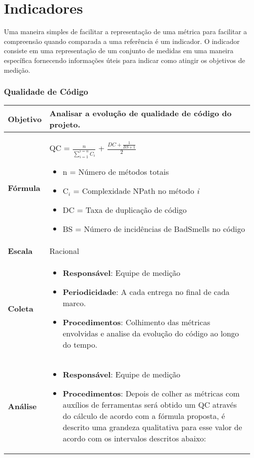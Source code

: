 \chapter{Indicadores}

Uma maneira simples de facilitar a representação de uma métrica para facilitar a compreensão quando comparada a uma referência é um indicador. O indicador consiste em uma representação de um conjunto de medidas em uma maneira específica fornecendo informações úteis para indicar como atingir os objetivos de medição.

\subsection{Qualidade de Código}

   \begin{tabular}{ |p{3cm}|p{12cm}| }
   \hline
    \textbf{Objetivo} & Analisar a evolução de qualidade de código do projeto. \\
   \hline
    \textbf{Fórmula} & QC = $\frac{n}{\sum_{i=1}^{i=n} C_i}$ + $\frac{DC + \frac{1}{BS + 1}}{2}$ \begin{itemize}
			\item n = Número de métodos totais
			\item C$_i$ = Complexidade NPath no método \textit{i}
			\item DC = Taxa de duplicação de código
			\item BS = Número de incidências de BadSmells no código
		\end{itemize}\\
   \hline
    \textbf{Escala} & Racional \\
   \hline
    \textbf{Coleta} & \begin{itemize}
		 \item \textbf{Responsável}: Equipe de medição
     \item \textbf{Periodicidade}: A cada entrega no final de cada marco.
     \item \textbf{Procedimentos}: Colhimento das métricas envolvidas e analise da evolução do código ao longo do tempo.
    \end{itemize} \\
   \hline
    \textbf{Análise} & \begin{itemize} \item \textbf{Responsável}: Equipe de medição
    \item \textbf{Procedimentos}: Depois de colher as métricas com auxílios de ferramentas será obtido um QC através do cálculo de acordo com a fórmula proposta, é descrito uma grandeza qualitativa para esse valor de acordo com os intervalos descritos abaixo:

\end{itemize}
\end{tabular}
